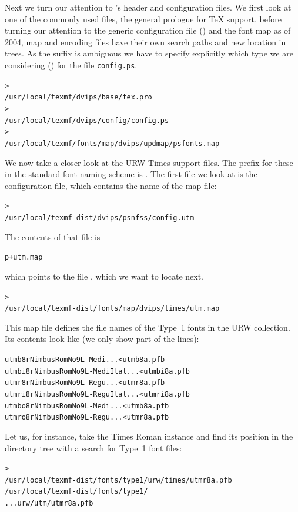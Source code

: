 \documentclass[12pt]{article}
\begin{document}
Next we turn our attention to 's header and configuration
files.  We first look at one of the commonly used files, the general
prologue  for \TeX{} support, before turning our attention
to the generic configuration file () and the \PS{} font
map \Dash as of 2004, map and encoding files have
their own search paths and new location in  trees.  As
the  suffix is ambiguous we have to specify explicitly which
type we are considering () for the file
\texttt{config.ps}.
\begin{alltt}
> 
   /usr/local/texmf/dvips/base/tex.pro
> 
   /usr/local/texmf/dvips/config/config.ps
> 
   /usr/local/texmf/fonts/map/dvips/updmap/psfonts.map
\end{alltt}

We now take a closer look at the URW Times \PS{} support
files.  The prefix for these in the standard font naming scheme is
.  The first file we look at is the configuration file,
which contains the name of the map file:
\begin{alltt}
> 
   /usr/local/texmf-dist/dvips/psnfss/config.utm
\end{alltt}
The contents of that file is
\begin{alltt}
  p +utm.map
\end{alltt}
which points to the file , which we want to
locate next.
\begin{alltt}
> 
   /usr/local/texmf-dist/fonts/map/dvips/times/utm.map
\end{alltt}
This map file defines the file names of the Type~1 \PS{} fonts in
the URW collection.  Its contents look like (we only show part of the
lines):
\begin{alltt}
utmb8r  NimbusRomNo9L-Medi    ... <utmb8a.pfb
utmbi8r NimbusRomNo9L-MediItal... <utmbi8a.pfb
utmr8r  NimbusRomNo9L-Regu    ... <utmr8a.pfb
utmri8r NimbusRomNo9L-ReguItal... <utmri8a.pfb
utmbo8r NimbusRomNo9L-Medi    ... <utmb8a.pfb
utmro8r NimbusRomNo9L-Regu    ... <utmr8a.pfb
\end{alltt}
Let us, for instance, take the Times Roman instance
 and find its position in the  directory
tree with a search for Type~1 font files:
\begin{alltt}
> 
\ifSingleColumn   /usr/local/texmf-dist/fonts/type1/urw/times/utmr8a.pfb
\else   /usr/local/texmf-dist/fonts/type1/
... urw/utm/utmr8a.pfb
\fi\end{alltt}
\end{document}
